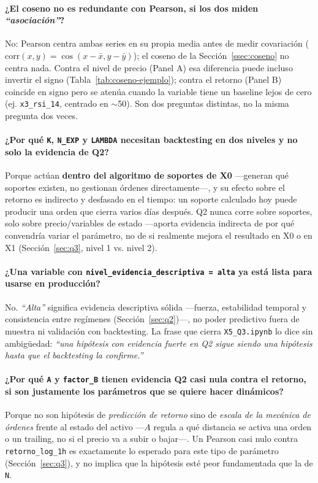 \documentclass[11pt,a4paper]{article}
\newcommand{\code}[1]{\texttt{\small #1}}
\newcommand{\dq}[1]{\emph{``#1''}}
\begin{document}
\paragraph{¿El coseno no es redundante con Pearson, si los dos miden \dq{asociación}?}
No: Pearson centra ambas series en su propia media antes de medir covariación
(\(\mathrm{corr}(x,y)=\cos(x-\bar{x},y-\bar{y})\)); el coseno de la
Sección~\ref{ssec:coseno} no centra nada. Contra el nivel de precio (Panel A) esa
diferencia puede incluso invertir el signo (Tabla~\ref{tab:coseno-ejemplo}); contra el
retorno (Panel B) coincide en signo pero se atenúa cuando la variable tiene un baseline
lejos de cero (ej. \code{x3\_rsi\_14}, centrado en \(\sim\)50). Son dos preguntas
distintas, no la misma pregunta dos veces.

\paragraph{¿Por qué \code{K}, \code{N\_EXP} y \code{LAMBDA} necesitan backtesting en dos
niveles y no solo la evidencia de Q2?}
Porque actúan \textbf{dentro del algoritmo de soportes de X0} —generan qué soportes
existen, no gestionan órdenes directamente—, y su efecto sobre el retorno es indirecto y
desfasado en el tiempo: un soporte calculado hoy puede producir una orden que cierra
varios días después. Q2 nunca corre sobre soportes, solo sobre precio/variables de
estado —aporta evidencia indirecta de por qué convendría variar el parámetro, no de si
realmente mejora el resultado en X0 o en X1 (Sección~\ref{sec:q3}, nivel 1 vs. nivel 2).

\paragraph{¿Una variable con \code{nivel\_evidencia\_descriptiva = alta} ya está lista
para usarse en producción?}
No. \dq{Alta} significa evidencia descriptiva sólida —fuerza, estabilidad temporal y
consistencia entre regímenes (Sección~\ref{sec:q2})—, no poder predictivo fuera de
muestra ni validación con backtesting. La frase que cierra \code{X5\_Q3.ipynb} lo dice sin
ambigüedad: \dq{una hipótesis con evidencia fuerte en Q2 sigue siendo una hipótesis hasta
que el backtesting la confirme.}

\paragraph{¿Por qué \code{A} y \code{factor\_B} tienen evidencia Q2 casi nula contra el
retorno, si son justamente los parámetros que se quiere hacer dinámicos?}
Porque no son hipótesis de \emph{predicción de retorno} sino de \emph{escala de la
mecánica de órdenes} frente al estado del activo —\(A\) regula a qué distancia se activa
una orden o un trailing, no si el precio va a subir o bajar—. Un Pearson casi nulo contra
\code{retorno\_log\_1h} es exactamente lo esperado para este tipo de parámetro
(Sección~\ref{sec:q3}), y no implica que la hipótesis esté peor fundamentada que la de
\code{N}.
\end{document}
